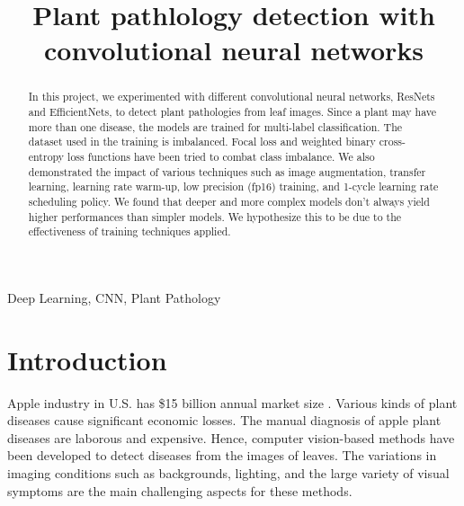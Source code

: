 \documentclass[conference]{IEEEtran}
\begin{document}

\title{Plant pathlology detection with convolutional neural networks\\ }

\author{
}


\maketitle

\begin{abstract}
    In this project, we experimented with different convolutional neural networks, ResNets and EfficientNets, to detect plant pathologies from leaf images. Since a plant may have more than one disease, the models are trained for multi-label classification. The dataset used in the training is imbalanced. Focal loss and weighted binary cross-entropy loss functions have been tried to combat class imbalance. We also demonstrated the impact of various techniques such as image augmentation, transfer learning, learning rate warm-up, low precision (fp16) training, and 1-cycle learning rate scheduling policy. We found that deeper and more complex models don't always yield higher performances than simpler models. We hypothesize this to be due to the effectiveness of training techniques applied. 
\end{abstract}

\begin{IEEEkeywords}
Deep Learning, CNN, Plant Pathology
\end{IEEEkeywords}

\section{Introduction}

Apple industry in U.S. has \$15 billion annual market size \cite{Thapa2020}. 
Various kinds of plant diseases cause significant economic losses. 
The manual diagnosis of apple plant diseases are laborous and expensive. 
Hence, computer vision-based methods have been developed to detect diseases from the images of leaves. 
The variations in imaging conditions such as backgrounds, lighting, and the large variety of visual symptoms are the main challenging aspects for these methods. 
\end{document}

